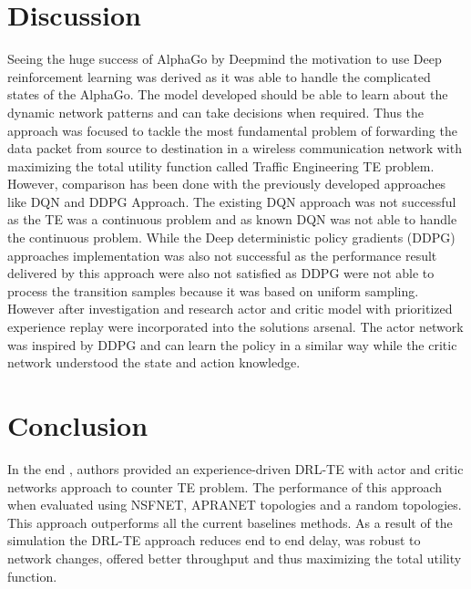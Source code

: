 \section{Discussion}
\label{sec:dis}

Seeing the huge success of AlphaGo by Deepmind the motivation to use Deep reinforcement learning was derived as it was able to handle the complicated states of the AlphaGo. The model developed should be able to learn about the dynamic network patterns and can take decisions when required. Thus the approach was focused to tackle the most fundamental problem of forwarding the data packet from source to destination in a wireless communication network with maximizing the total utility function called Traffic Engineering TE problem. However, comparison has been done with the previously developed approaches like DQN and DDPG Approach. The existing DQN approach was not successful as the TE was a continuous problem and as known DQN was not able to handle the continuous problem. While the Deep deterministic policy gradients (DDPG) approaches implementation was also not successful as the performance result delivered by this approach were also not satisfied as DDPG were not able to process the transition samples because it was based on uniform sampling. However after investigation and research actor and critic model with prioritized experience replay were incorporated into the solutions arsenal. The actor network was inspired by DDPG and can learn the policy in a similar way while the critic network understood the state and action knowledge. 

\section{Conclusion}
\label{sec:concl}

In the end , authors provided an experience-driven DRL-TE  \cite{Exp:_DRLapproach} with actor and critic networks approach to counter TE problem. The performance of this approach when evaluated using NSFNET, APRANET topologies and a random topologies. This approach outperforms all the current baselines methods. As a result of the simulation the DRL-TE approach reduces end to end delay, was robust to network changes, offered better throughput and thus maximizing the total utility function.